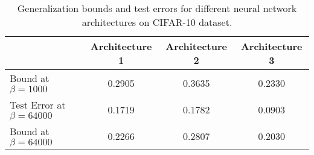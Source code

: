 
\begin{table}[h]
\centering
\begin{tabular}{|l|c|c|c|}
\hline
& Architecture 1 & Architecture 2 & Architecture 3 \\
\hline
Bound at $\beta = 1000$ & 0.2905 & 0.3635 & 0.2330 \\
\hline
Test Error at $\beta = 64000$ & 0.1719 & 0.1782 & 0.0903 \\
\hline
Bound at $\beta = 64000$ & 0.2266 & 0.2807 & 0.2030 \\
\hline
\end{tabular}
\caption{Generalization bounds and test errors for different neural network architectures on CIFAR-10 dataset.}
\label{tab:cifar_results}
\end{table}
